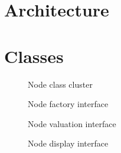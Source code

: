 
\section{Architecture}

\section{Classes}






%
\begin{figure}[htbp]
\begin{center}
\caption{Node class cluster}
\label{fig:NyayaNodeCluster}
\end{center}
\end{figure}

\begin{figure}[htbp]
\begin{center}
\caption{Node factory interface}
\label{fig:NyayaNodeCreation}
\end{center}
\end{figure}

\begin{figure}[htbp]
\begin{center}
\caption{Node valuation interface}
\label{fig:NyayaNodeValuation}
\end{center}
\end{figure}

\begin{figure}[htbp]
\begin{center}
\caption{Node display interface}
\label{fig:NyayaNodeDisplay}
\end{center}
\end{figure}

